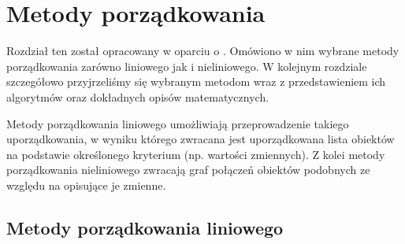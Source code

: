 \documentclass[12pt,a4paper]{report}
\newtheorem{definition}[theorem]{Definicja}
\newtheorem{example}{Przykład}
\begin{document}
%


\chapter{Metody porządkowania}\label{metody porzadkowania}
Rozdział ten został opracowany w oparciu o \cite[Rozdział 2]{panek2013}. Omówiono w nim wybrane metody porządkowania zarówno liniowego jak i nieliniowego. W kolejnym rozdziale szczegółowo przyjrzeliśmy się wybranym metodom wraz z przedstawieniem ich algorytmów oraz dokładnych opisów matematycznych. 

Metody porządkowania liniowego umożliwiają przeprowadzenie takiego uporządkowania, w wyniku którego zwracana jest uporządkowana lista obiektów na podstawie określonego kryterium (np. wartości zmiennych). 
Z kolei metody porządkowania nieliniowego zwracają graf połączeń obiektów podobnych ze względu na opisujące je zmienne. 

\section{Metody porządkowania liniowego}
\end{document}
